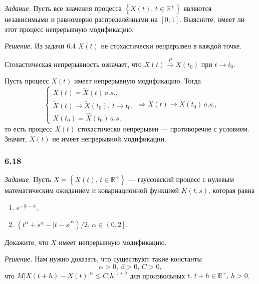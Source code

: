 \textit{Задание.}
Пусть все значения процесса $ \left\{ X \left( t \right), \, t \in \mathbb{R}^+ \right\} $
являются независимыми и равномерно распределёнными на $ \left[ 0, 1 \right] $.
Выясните, имеет ли этот процесс непрерывную модификацию.

\textit{Решение.}
Из задачи 6.4 $X \left( t \right) $ не стохастически непрерывен в каждой точке.

Стохастическая непрерывность означает,
что $X \left( t \right) \overset{P}{ \to } X \left( t_0 \right) $ при $t \to t_0$.

Пусть процесс $X \left( t \right) $ имеет непрерывную модификацию.
Тогда
$$ \begin{cases}
    X \left( t \right) = \tilde{X} \left( t \right) \, a.s., \\
    \tilde{X} \left( t \right) \to \tilde{X} \left( t_0 \right), \, t \to t_0, \\
    X \left( t_0 \right) = \hat{X} \left( t_0 \right) \, a.s.
  \end{cases} \Rightarrow X \left( t \right) \to X \left( t_0 \right) \, a.s.,$$
то есть процесс $X \left( t \right) $ стохастически непрерывен --- противоречие с условием.
Значит, $X \left( t \right) $ не имеет непрерывной модификации.

\subsubsection*{6.18}

\textit{Задание.}
Пусть $X = \left\{ X \left( t \right), \, t \in \mathbb{R}^+ \right\} $ ---
гауссовский процесс с нулевым математическим ожиданием и ковариационной функцией
$K \left( t, s \right) $, которая равна
\begin{enumerate}[label=\alph*)]
  \item $e^{-\left| t - s \right| }$,
  \item $ \left( t^{ \alpha } + s^{ \alpha } - \left| t - s \right|^{ \alpha } \right) / 2, \,
    \alpha \in \left( 0, 2 \right] $.
\end{enumerate}
Докажите, что $X$ имеет непрерывную модификацию.

\textit{Решение.}
Нам нужно доказать, что существуют такие константы
$$ \alpha > 0, \,
  \beta > 0, \,
  C > 0,$$
что
$M \left| X \left( t + h \right) - X \left( t \right) \right|^{ \alpha} \leq
  C \left| h \right|^{1 + \beta }$
для произвольных $t, \, t + h \in \mathbb{R}^+, \, h > 0$.

